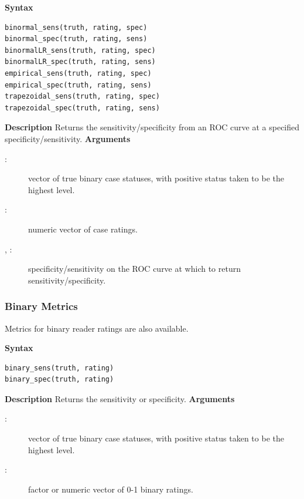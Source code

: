 \documentclass[
]{jss}
\newenvironment{Description}{\textbf{Description}\vspace{0.5em}\newline}{\vspace{0.5em}\newline}
\begin{document}
\begin{tcolorbox}[title=ROC Curve Sensitivity and Specificity Functions]
\textbf{Syntax}
\begin{verbatim}
binormal_sens(truth, rating, spec)
binormal_spec(truth, rating, sens)
binormalLR_sens(truth, rating, spec)
binormalLR_spec(truth, rating, sens)
empirical_sens(truth, rating, spec)
empirical_spec(truth, rating, sens)
trapezoidal_sens(truth, rating, spec)
trapezoidal_spec(truth, rating, sens)
\end{verbatim}
\begin{Description}
Returns the sensitivity/specificity from an ROC curve at a specified specificity/sensitivity.
\end{Description}
\textbf{Arguments}
\begin{description}
\item[:] vector of true binary case statuses, with positive status taken to be the highest level.
\item[:] numeric vector of case ratings.
\item[, :] specificity/sensitivity on the ROC curve at which to return sensitivity/specificity.
\end{description}
\end{tcolorbox}

\hypertarget{binary-metrics}{%
\subsubsection{Binary Metrics}\label{binary-metrics}}

Metrics for binary reader ratings are also available.

\begin{tcolorbox}[title=Sensitivity and Specificity Functions]
\textbf{Syntax}
\begin{verbatim}
binary_sens(truth, rating)
binary_spec(truth, rating)
\end{verbatim}
\begin{Description}
Returns the sensitivity or specificity.
\end{Description}
\textbf{Arguments}
\begin{description}
\item[:] vector of true binary case statuses, with positive status taken to be the highest level.
\item[:] factor or numeric vector of 0-1 binary ratings.
\end{description}
\end{tcolorbox}
\end{document}
